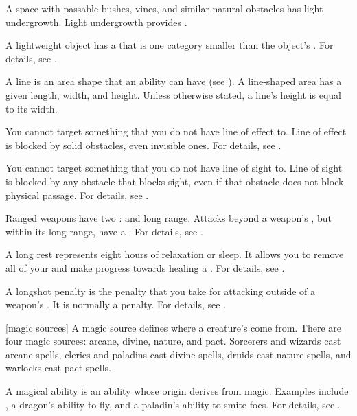  A space with passable bushes, vines, and similar natural obstacles has light undergrowth.
Light undergrowth provides .

 A lightweight object has a  that is one category smaller than the object's .
For details, see .

 A line is an area shape that an ability can have (see ).
A line-shaped area has a given length, width, and height.
Unless otherwise stated, a line's height is equal to its width.

 You cannot target something that you do not have line of effect to.
Line of effect is blocked by solid obstacles, even invisible ones.
For details, see .

 You cannot target something that you do not have line of sight to.
Line of sight is blocked by any obstacle that blocks sight, even if that obstacle does not block physical passage.
For details, see .

 Ranged weapons have two :  and long range.
Attacks beyond a weapon's , but within its long range, have a  .
For details, see .

 A long rest represents eight hours of relaxation or sleep.
It allows you to remove all of your  and make progress towards healing a .
For details, see .

 A longshot penalty is the penalty that you take for attacking outside of a weapon's .
It is normally a   penalty.
For details, see .

[magic sources] A magic source defines where a creature's  come from.
There are four magic sources: arcane, divine, nature, and pact.
Sorcerers and wizards cast arcane spells, clerics and paladins cast divine spells, druids cast nature spells, and warlocks cast pact spells.

 A magical ability is an ability whose origin derives from magic.
Examples include , a dragon's ability to fly, and a paladin's ability to smite foes.
For details, see .


